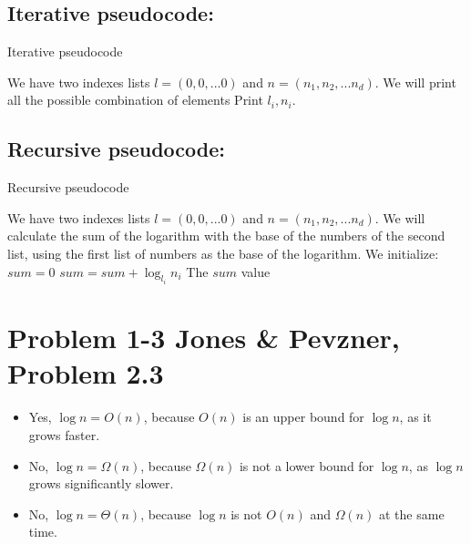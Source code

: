 \documentclass{article}
\begin{document}
\subsection*{Iterative pseudocode:}

\begin{algorithm}[H]
\caption{Iterative pseudocode}
\begin{algorithmic}[1]
\State We have two indexes lists $l = (0,0,...0)$ and $n = (n_1,n_2,...n_d)$.
\State We will print all the possible combination of elements
  \State Print $l_i,n_i$.
 \EndFor
\EndFor
\end{algorithmic}
\end{algorithm}

\subsection*{Recursive pseudocode:}
\begin{algorithm}[H]
\caption{Recursive pseudocode}
\begin{algorithmic}[1]
\State We have two indexes lists $l = (0,0,...0)$ and $n = (n_1,n_2,...n_d)$.
\State We will calculate the sum of the logarithm with the base of the numbers of the second list, using the first list of numbers as the base of the logarithm.
\State We initialize: $sum = 0$
 \State $sum = sum + \log_{l_i} n_i$
\EndFor
\Return The $sum$ value
\end{algorithmic}
\end{algorithm}

\section*{Problem 1-3 Jones \& Pevzner, Problem 2.3}

\begin{itemize}

\item Yes, $\log n = O(n)$, because $O(n)$ is an upper bound for $\log n$, as it grows faster.

\item No, $\log n = \Omega(n)$, because $\Omega(n)$ is not a lower bound for $\log n$, as $\log n$ grows significantly slower.

\item No, $\log n = \Theta(n)$, because $\log n$ is not $O(n)$ and $\Omega(n)$ at the same time.

\end{itemize}
\end{document}
